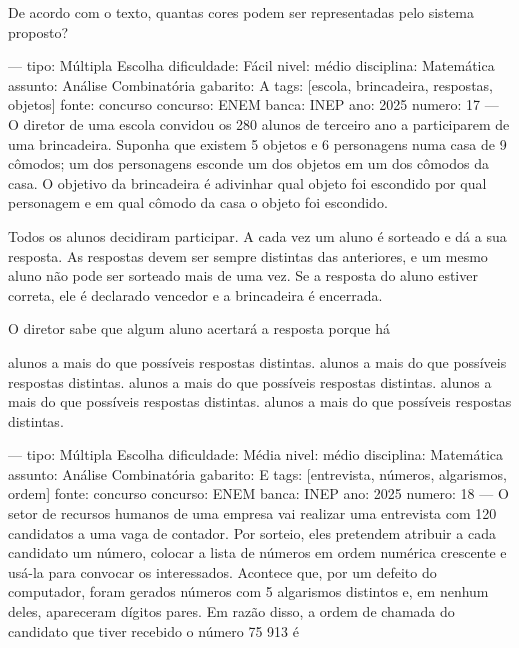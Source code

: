 De acordo com o texto, quantas cores podem ser representadas pelo sistema proposto?
\begin{oneparchoices}
\end{oneparchoices}

---
tipo: Múltipla Escolha
dificuldade: Fácil
nivel: médio
disciplina: Matemática
assunto: Análise Combinatória
gabarito: A
tags: [escola, brincadeira, respostas, objetos]
fonte: concurso
concurso: ENEM
banca: INEP
ano: 2025
numero: 17
---
\question
O diretor de uma escola convidou os 280 alunos de terceiro ano a participarem de uma brincadeira. Suponha que existem 5 objetos e 6 personagens numa casa de 9 cômodos; um dos personagens esconde um dos objetos em um dos cômodos da casa. O objetivo da brincadeira é adivinhar qual objeto foi escondido por qual personagem e em qual cômodo da casa o objeto foi escondido.

Todos os alunos decidiram participar. A cada vez um aluno é sorteado e dá a sua resposta. As respostas devem ser sempre distintas das anteriores, e um mesmo aluno não pode ser sorteado mais de uma vez. Se a resposta do aluno estiver correta, ele é declarado vencedor e a brincadeira é encerrada.

O diretor sabe que algum aluno acertará a resposta porque há
\begin{choices}
 alunos a mais do que possíveis respostas distintas.
 alunos a mais do que possíveis respostas distintas.
 alunos a mais do que possíveis respostas distintas.
 alunos a mais do que possíveis respostas distintas.
 alunos a mais do que possíveis respostas distintas.
\end{choices}

---
tipo: Múltipla Escolha
dificuldade: Média
nivel: médio
disciplina: Matemática
assunto: Análise Combinatória
gabarito: E
tags: [entrevista, números, algarismos, ordem]
fonte: concurso
concurso: ENEM
banca: INEP
ano: 2025
numero: 18
---
\question
O setor de recursos humanos de uma empresa vai realizar uma entrevista com 120 candidatos a uma vaga de contador. Por sorteio, eles pretendem atribuir a cada candidato um número, colocar a lista de números em ordem numérica crescente e usá-la para convocar os interessados. Acontece que, por um defeito do computador, foram gerados números com 5 algarismos distintos e, em nenhum deles, apareceram dígitos pares. Em razão disso, a ordem de chamada do candidato que tiver recebido o número 75 913 é
\begin{oneparchoices}
\end{oneparchoices}

